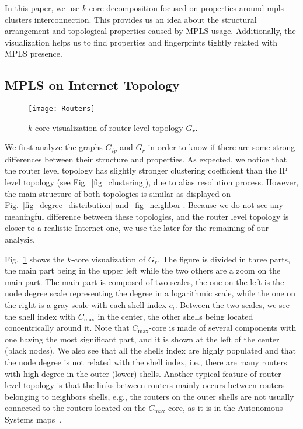 In this paper, we use $k$-core decomposition focused on properties around mpls
clusters interconnection. This provides us an idea about the
structural arrangement and topological properties caused by MPLS usage.
Additionally, the visualization helps us to find properties and fingerprints
tightly related with MPLS presence.

\subsection{MPLS on Internet Topology}\label{cluster.topo}
\begin{figure}[!t]
  \begin{center}
    \texttt{[image: Routers]}
  \end{center}
  \caption{$k$-core visualization of router level topology $G_{r}$.}
  \label{fig_k_core_routers}
\end{figure}

We first analyze the graphs $G_{ip}$ and $G_{r}$ in order to know if there are
some strong differences between their structure and properties. As expected, we
notice that the router level topology has slightly stronger clustering
coefficient than the IP level topology (see Fig.~\ref{fig_clustering}), due to
alias resolution process.  However, the main structure of both topologies is
similar as displayed on Fig.~\ref{fig_degree_distribution}
and~\ref{fig_neighbor}. Because we do not see any meaningful difference
between these topologies, and the router level topology is closer to a
realistic Internet one, we use the later for the remaining of our analysis.

Fig.~\ref{fig_k_core_routers} shows the $k$-core visualization of $G_{r}$.  The
figure is divided in three parts, the main part being in the upper left while
the two others are a zoom on the main part.  The main part is composed of two
scales, the one on the left is the node degree scale representing the degree in
a logarithmic scale, while the one on the right is a gray scale with each shell
index $c_i$.  Between the two scales, we see the shell index with $C_{\max}$ in
the center, the other shells being located concentrically around it. Note that
$C_{\max}$-core is made of several components with one having the most
significant part, and it is shown at the left of the center (black nodes).  We
also see that all the shells index are highly populated and that the node degree
is not related with the shell index, i.e., there are many routers with high
degree in the outer (lower) shells.  Another typical feature of router level
topology is that the links between routers mainly occurs between routers
belonging to neighbors shells, e.g., the routers on the outer shells are not
usually connected to the routers located on the  $C_{\max}$-core, as it is in
the Autonomous Systems maps~\cite{Alvarez06k}.

